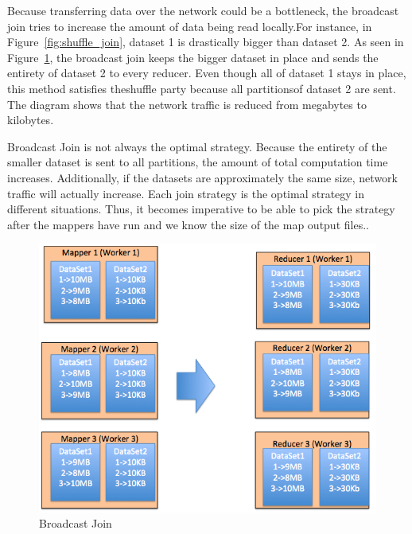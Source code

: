 Because transferring data over the network could be a bottleneck, the broadcast join tries to increase the amount of data 
being read locally.For instance, in Figure~\ref{fig:shuffle_join}, dataset 1 is drastically bigger than dataset 2. As seen in Figure~\ref{fig:broadcast_join},
the broadcast join keeps the bigger dataset in place and sends the entirety of dataset 2 to every reducer. Even though all of dataset 1 stays in place, this method satisfies theshuffle party because all partitionsof dataset 2 are sent. The diagram shows that the network traffic is reduced from megabytes to kilobytes.

Broadcast Join is not always the optimal strategy. Because the entirety of the smaller dataset is sent to all partitions, the amount of total computation time increases. Additionally, if the datasets are approximately the same size, network traffic will actually increase. 
Each join strategy is the optimal strategy in different situations. Thus, it becomes imperative
to be able to pick the strategy after the mappers have run and we know the size of the map output files..

 \begin{figure}[h]
\begin{center}
\includegraphics[scale=1.0]{./img/broadcast_join.png}
\caption{Broadcast Join}
\label{fig:broadcast_join}
\end{center}
\end{figure}


